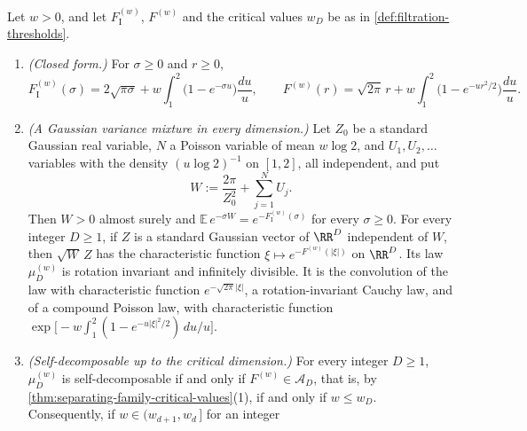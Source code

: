 \begin{proposition}
\label{prop:separating-family-mixtures}
Let $w > 0$, and let $F^{(w)}_{\mathrm I}$, $F^{(w)}$ and the critical values $w_D$ be as in
\ref{def:filtration-thresholds}.
\begin{enumerate}
\item \emph{(Closed form.)} For $\sigma \ge 0$ and $r \ge 0$,
\[
  F^{(w)}_{\mathrm I}(\sigma) = 2\sqrt{\pi\sigma} + w\int_1^2\bigl(1 - e^{-\sigma u}\bigr)\frac{du}{u},
  \qquad
  F^{(w)}(r) = \sqrt{2\pi}\,r + w\int_1^2\bigl(1 - e^{-u r^2/2}\bigr)\frac{du}{u} .
\]
\item \emph{(A Gaussian variance mixture in every dimension.)} Let $Z_0$ be a standard Gaussian
real variable, $N$ a Poisson variable of mean $w\log 2$, and $U_1, U_2, \dots$ variables with the
density $(u\log 2)^{-1}$ on $[1,2]$, all independent, and put
\[
  W := \frac{2\pi}{Z_0^2} + \sum_{j=1}^{N}U_j .
\]
Then $W > 0$ almost surely and $\mathbb{E}\,e^{-\sigma W} = e^{-F^{(w)}_{\mathrm I}(\sigma)}$ for
every $\sigma \ge 0$. For every integer $D \ge 1$, if $Z$ is a standard Gaussian vector of
$\RR^D$ independent of $W$, then $\sqrt W\,Z$ has the characteristic function
$\xi \mapsto e^{-F^{(w)}(|\xi|)}$ on $\RR^D$. Its law $\mu^{(w)}_D$ is rotation invariant and
infinitely divisible. It is the convolution of the law with characteristic function
$e^{-\sqrt{2\pi}|\xi|}$, a rotation-invariant Cauchy law, and of a compound Poisson law, with
characteristic function $\exp\bigl[-w\int_1^2(1 - e^{-u|\xi|^2/2})\,du/u\bigr]$.
\item \emph{(Self-decomposable up to the critical dimension.)} For every integer $D \ge 1$,
$\mu^{(w)}_D$ is self-decomposable if and only if $F^{(w)} \in \mathcal{A}_D$, that is, by
\ref{thm:separating-family-critical-values}(1), if and only if $w \le w_D$. Consequently, if
$w \in (w_{d+1}, w_d\,]$ for an integer

\end{enumerate}
\end{proposition}
